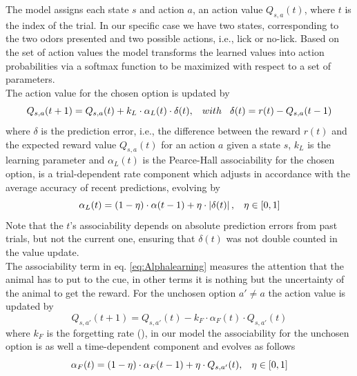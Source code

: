 The model assigns each state $s$ and action $a$, an action value $Q_{s,a}(t)$, where $t$ is the index of the trial. In our specific case we have two states, corresponding to the two odors presented and two possible actions, i.e., lick or no-lick. 
Based on the set of action values the model transforms the learned values into action probabilities via a softmax function to be maximized with respect to a set of parameters.\\The action value for the chosen option is updated by
\begin{equation}
Q_{s,a}(t+1)  = Q_{s,a}(t)+k_L\cdot\alpha_L(t)\cdot\delta(t), \hspace{0.3cm} with \hspace{0.3cm}\delta(t)=r(t)-Q_{s,a}(t-1)
\label{eq:Qlearning}
\end{equation}
where $\delta$ is the prediction error, i.e., the difference between the reward $r(t)$ and the expected reward value $Q_{s,a}(t)$ for an action $a$ given a state $s$, $k_L$ is the learning parameter and $\alpha_L(t)$ is the Pearce-Hall associability for the chosen option, is a trial-dependent rate component which adjusts in accordance with the average accuracy of recent predictions, evolving by
\begin{equation}
   \alpha_L(t)=(1-\eta)\cdot\alpha(t-1)+\eta\cdot\left\lvert\delta(t)\right\rvert,\hspace{0.3cm} \eta\in[0,1]
    \label{eq:Alphalearning}
\end{equation}
Note that the $t$'s associability depends on absolute prediction errors from past trials, but not the current one, ensuring that $\delta(t)$ was not double counted in the value update.\\The associability term in eq. \ref{eq:Alphalearning} measures the attention that the animal has to put to the cue, in other terms it is nothing but the uncertainty of the animal to get the reward. 
For the unchosen option $a'\neq a$ the action value is updated by
\begin{equation}
    Q_{s,a'}(t+1) = Q_{s,a'}(t)-k_F\cdot\alpha_F(t)\cdot Q_{s,a'}(t)
    \label{eq:Qforgetting}
\end{equation}
where $k_F$ is the forgetting rate (\cite{ItoDoya1}), in our model the associability for the unchosen option is as well a time-dependent component and evolves as follows
\begin{equation}
    \alpha_F(t)=(1-\eta)\cdot\alpha_F(t-1)+\eta\cdot Q_{s,a'}(t), \hspace{0.3cm}
    \eta\in[0,1]
    \label{eq:Alphaforgetting}
\end{equation}
